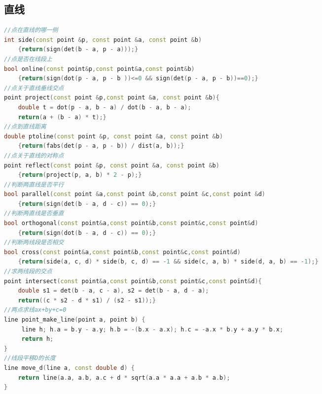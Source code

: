 \documentclass[landscape,a4paper]{article}
\begin{document}
\begin{spacing}{0.3}
\begin{multicols}{3}
\subsection{直线}
\begin{lstlisting}[language=C++]
//点在直线的哪一侧
int side(const point &p, const point &a, const point &b)
    {return(sign(det(b - a, p - a)));}
//点是否在线段上
bool online(const point&p,const point&a,const point&b)
    {return(sign(dot(p - a, p - b ))<=0 && sign(det(p - a, p - b))==0);}
//点关于直线垂线交点
point project(const point &p,const point &a, const point &b){
    double t = dot(p - a, b - a) / dot(b - a, b - a);
    return(a + (b - a) * t);}
//点到直线距离
double ptoline(const point &p, const point &a, const point &b)
    {return(fabs(det(p - a, p - b)) / dist(a, b));}
//点关于直线的对称点
point reflect(const point &p, const point &a, const point &b)
    {return(project(p, a, b) * 2 - p);}
//判断两直线是否平行
bool parallel(const point &a,const point &b,const point &c,const point &d)
    {return(sign(det(b - a, d - c)) == 0);}
//判断两直线是否垂直
bool orthogonal(const point&a,const point&b,const point&c,const point&d)
    {return(sign(dot(b - a, d - c)) == 0);}
//判断两线段是否相交
bool cross(const point&a,const point&b,const point&c,const point&d)
    {return(side(a, c, d) * side(b, c, d) == -1 && side(c, a, b) * side(d, a, b) == -1);}
//求两线段的交点
point intersect(const point&a,const point&b,const point&c,const point&d){
    double s1 = det(b - a, c - a), s2 = det(b - a, d - a);
    return((c * s2 - d * s1) / (s2 - s1));}
//两点求线ax+by+c=0
line point_make_line(point a, point b) {
     line h; h.a = b.y - a.y; h.b = -(b.x - a.x); h.c = -a.x * b.y + a.y * b.x;
     return h;
}
//线段平移D的长度
line move_d(line a, const double d) {
	return line(a.a, a.b, a.c + d * sqrt(a.a * a.a + a.b * a.b);
}
\end{lstlisting}

\end{multicols}
\end{spacing}
\end{document}
